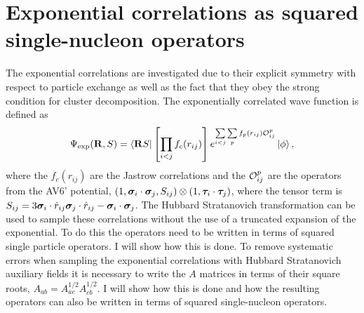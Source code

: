 \chapter{Exponential correlations as squared single-nucleon operators}
\label{app:a12}
\newpage
The exponential correlations are investigated due to their explicit symmetry with respect to particle exchange as well as the fact that they obey the strong condition for cluster decomposition. The exponentially correlated wave function is defined as
\begin{equation}
   \Psi_{\text{exp}}(\mathbf{R}, S) = \left< \mathbf{R} S \right|\left[\prod\limits_{i<j}f_c(r_{ij})\right] e^{\sum\limits_{i<j}\sum\limits_{p}f_p(r_{ij})\mathcal{O}_{ij}^p}\left| \phi \right>,
   \label{equ:exppsi}
\end{equation}
where the $f_c(r_{ij})$ are the Jastrow correlations and the $\mathcal{O}_{ij}^p$ are the operators from the AV6' potential, $(1,\bm{\sigma}_i\cdot\bm{\sigma}_j,S_{ij})\otimes(1,\bm{\tau}_i\cdot\bm{\tau}_j)$, where the tensor term is $S_{ij} = 3\bm{\sigma}_i\cdot\hat{r}_{ij}\bm{\sigma}_j\cdot\hat{r}_{ij}-\bm{\sigma}_i\cdot\bm{\sigma}_j$. The Hubbard Stratanovich transformation can be used to sample these correlations without the use of a truncated expansion of the exponential. To do this the operators need to be written in terms of squared single particle operators. I will show how this is done. To remove systematic errors when sampling the exponential correlations with Hubbard Stratanovich auxiliary fields it is necessary to write the $A$ matrices in terms of their square roots, $A_{ab} = A^{1/2}_{ac}A^{1/2}_{cb}$. I will show how this is done and how the resulting operators can also be written in terms of squared single-nucleon operators.

